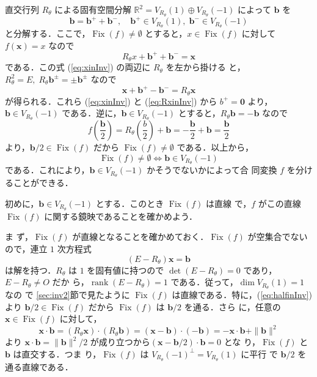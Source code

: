 \documentclass[11pt, uplatex, dvipdfmx, titlepage]{jsarticle}
\DeclareMathOperator{\Fix}{Fix}
\DeclareMathOperator{\rank}{rank}
\theoremstyle{definition}
\begin{document}
直交行列 $R_{\theta}$ による固有空間分解
$\mathbb{R}^2 = V_{R_{\theta}}(1) \oplus V_{R_{\theta}}(-1)$ によって $\bm{b}$
を
\begin{equation}\label{eq:eigendecomp2}
  \bm{b} = \bm{b}^{+} + \bm{b}^{-}, \quad \bm{b}^{+} \in V_{R_{\theta}}(1), \; \bm{b}^{-} \in V_{R_{\theta}}(-1)
\end{equation}
と分解する．ここで，$\Fix(f) \neq \emptyset$ とすると，$x \in \Fix(f)$
に対して $f(\bm{x}) = {x}$ なので
\begin{equation}\label{eq:xinInv}
  R_{\theta}x +\bm{b}^{+} + \bm{b}^{-} = \bm{x}
\end{equation}
である．この式 (\ref{eq:xinInv}) の両辺に $R_{\theta}$ を左から掛ける
と，$R_{\theta}^2=E, \; R_{\theta} \bm{b}^{\pm} = \pm \bm{b}^{\pm}$ なので
\begin{equation}\label{eq:RxinInv}
  \bm{x}+\bm{b}^{+}-\bm{b}^{-}=R_{\theta}\bm{x} 
\end{equation}
が得られる．これら (\ref{eq:xinInv}) と (\ref{eq:RxinInv}) から $b^{+}
= \bm{0}$ より，$\bm{b} \in V_{R_{\theta}}(-1)$
である．逆に，$\bm{b} \in V_{R_{\theta}}(-1)$ とすると，$R_{\theta}\bm{b}
= -\bm{b}$ なので
\begin{equation}\label{eq:halfinInv}
  f\left(\frac{\bm{b}}{2}\right) = R_{\theta}\left(\frac{b}{2}\right) + \bm{b}
  = -\frac{\bm{b}}{2}+\bm{b} = \frac{\bm{b}}{2}
\end{equation}
より，$\bm{b}/2 \in \Fix(f)$ だから $\Fix(f) \neq \emptyset$ である．以上から，
\[
  \Fix(f) \neq \emptyset \Leftrightarrow \bm{b} \in V_{R_{\theta}}(-1)
\]
である．これにより，$\bm{b} \in V_{R_{\theta}}(-1)$ かそうでないかによって合
同変換 $f$ を分けることができる．


初めに，$\bm{b} \in V_{R_{\theta}}(-1)$ とする．このとき $\Fix(f)$ は直線
で，$f$ がこの直線 $\Fix(f)$ に関する鏡映であることを確かめよう．

ま
ず，$\Fix(f)$ が直線となることを確かめておく．$\Fix(f)$ が空集合でない
ので，連立 $1$ 次方程式
\[
  (E-R_{\theta})\bm{x} = \bm{b}
\]
は解を持つ．$R_{\theta}$ は $1$ を固有値に持つので $\det
(E-R_{\theta}) = 0$ であり，$E-R_{\theta} \neq O$ だか
ら，$\rank(E-R_{\theta})=1$ である．従って，$\dim V_{R_{\theta}}(1)=1$ なの
で \ref{sec:inv2}節で見たように $\Fix(f)$ は直線である．特に，(\ref{eq:halfinInv})
より $\bm{b}/2 \in \Fix(f)$ だから $\Fix(f)$ は $\bm{b}/2$ を通る．さら
に，任意の $\bm{x} \in \Fix(f)$ に対して，
\[
  \bm{x} \cdot \bm{b} = (R_{\theta}\bm{x}) \cdot  (R_{\theta}\bm{b}) =
  (\bm{x}-\bm{b})\cdot (-\bm{b}) = -\bm{x}\cdot \bm{b}+\|\bm{b}\|^2
\]
より $\bm{x}\cdot  \bm{b} = \|\bm{b}\|^2/2$
が成り立つから$\left( \bm{x}-\bm{b}/2\right) \cdot  \bm{b}=0$ とな
り，$\Fix(f)$ と $\bm{b}$ は直交する．つま
り，$\Fix(f)$ は $V_{R_{\theta}}(-1)^{\perp}=V_{R_{\theta}}(1)$ に平行
で $\bm{b}/2$ を通る直線である．
\end{document}
